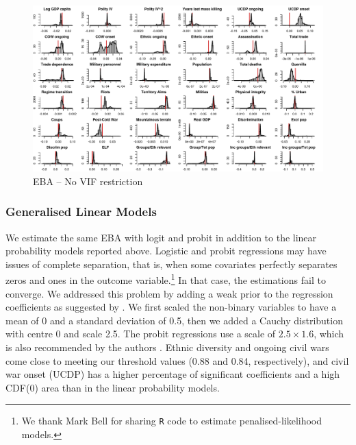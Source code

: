 \clearpage
\begin{figure}
    \centering
    \includegraphics[width=\textwidth]{images/mk-no-vif.pdf}
    \caption{EBA -- No VIF restriction}
    \label{fig:mk-no-vif}
\end{figure}
\clearpage

\subsubsection{Generalised Linear Models}

We estimate the same EBA with logit and probit in addition to the linear probability models reported above. Logistic and probit regressions may have issues of complete separation, that is, when some covariates perfectly separates zeros and ones in the outcome variable.\footnote{We thank Mark Bell for sharing \texttt{R} code to estimate penalised-likelihood models.} In that case, the estimations fail to converge. We addressed this problem by adding a weak prior to the regression coefficients as suggested by \citet{gelman2008weakly}. We first scaled the non-binary variables to have a mean of 0 and a standard deviation of 0.5, then we added a Cauchy distribution with centre 0 and scale 2.5. The probit regressions use a scale of $2.5 \times 1.6$, which is also recommended by the authors \citep{arm2017rpackage}. Ethnic diversity and ongoing civil wars come close to meeting our threshold values (0.88 and 0.84, respectively), and civil war onset (UCDP) has a higher percentage of significant coefficients and a high CDF(0) area than in the linear probability models.

\vspace{1cm}

